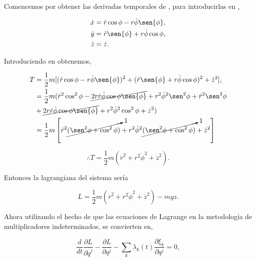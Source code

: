\documentclass[a4paper,10pt]{article}
\numberwithin{equation}{section}
\begin{document}
Comencemos por obtener las derivadas temporales de , 
para introducirlas en ,

\begin{align}
 \dot{x} &= \dot{r}\cos{\phi} - r \dot{\phi}\sen{\phi}, \\
 \dot{y} &= \dot{r}\sen{\phi} + r \dot{\phi}\cos{\phi}, \\
 \dot{z} &= \dot{z}.
 \label{eq:derivTemprTransfCoordParab}
\end{align}

Introduciendo  en  obtenemos,

\begin{align}
 \begin{split}
  T &= \frac{1}{2}m [( \dot{r}\cos{\phi} - r \dot{\phi}\sen{\phi})^2
  + (\dot{r}\sen{\phi} + r \dot{\phi}\cos{\phi})^2 + \dot{z}^2], \\
  &= \frac{1}{2} m (\dot{r}^2\cos^2{\phi} - \cancel{2r\dot{r}\dot{\phi}\cos{\phi}\sen{\phi}} + 
  r^2\dot{\phi}^2 \sen^2{\phi} +  \dot{r}^2\sen^2{\phi} \\
  &+ \cancel{2r\dot{r}\dot{\phi}\cos{\phi}\sen{\phi}}
  + r^2\dot{\phi}^2 \cos^2{\phi} + \dot{z}^2 ) \\
  &= \frac{1}{2} m \left[ \dot{r}^2\cancelto{1}{(\sen^2{\phi} + \cos^2{\phi})}
  + r^2\dot{\phi}^2 \cancelto{1}{(\sen^2{\phi} + \cos^2{\phi})} + \dot{z}^2 \right]
 \end{split}
\end{align}

\begin{equation}
 \therefore T = \frac{1}{2}m(\dot{r}^2 + r^2\dot{\phi}^2 + \dot{z}^2).
 \label{eq:energCinetParab2}
\end{equation}

Entonces la lagrangiana del sistema sería

\begin{equation}
 L = \frac{1}{2} m(\dot{r}^2 + r^2\dot{\phi}^2 + \dot{z}^2) - mgz.
\end{equation}

Ahora utilizando el hecho de que las ecuaciones de Lagrange en la metodología de 
multiplicadores indeterminados, se convierten en,

\begin{equation}
  \frac{d}{dt}\frac{\partial L}{\partial \dot{q}^j} - \frac{\partial L}{\partial q^j}  
 - \sum_k \lambda_k(t) \frac{\partial \xi_k}{\partial q^j} = 0,
\end{equation}
\end{document}
